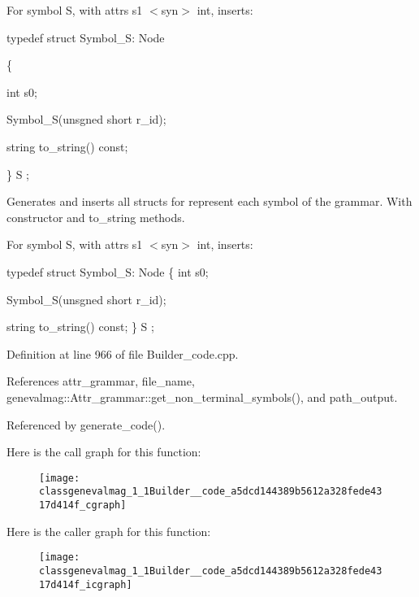 For symbol S, with attrs s1 $<$syn$>$ int, inserts:\par
 \par
 typedef struct Symbol\_\-S: Node\par
 \{\par
 int s0;\par
 \par
 Symbol\_\-S(unsgned short r\_\-id);\par
 \par
 string to\_\-string() const;\par
 \} S ;\par


Generates and inserts all structs for represent each symbol of the grammar. With constructor and to\_\-string methods.

For symbol S, with attrs s1 $<$syn$>$ int, inserts:

typedef struct Symbol\_\-S: Node \{ int s0;

Symbol\_\-S(unsgned short r\_\-id);

string to\_\-string() const; \} S ; 

Definition at line 966 of file Builder\_\-code.cpp.



References attr\_\-grammar, file\_\-name, genevalmag::Attr\_\-grammar::get\_\-non\_\-terminal\_\-symbols(), and path\_\-output.



Referenced by generate\_\-code().



Here is the call graph for this function:\nopagebreak
\begin{figure}[H]
\begin{center}
\leavevmode
\texttt{[image: classgenevalmag\_1\_1Builder\_\_code\_a5dcd144389b5612a328fede4317d414f\_cgraph]}
\end{center}
\end{figure}




Here is the caller graph for this function:\nopagebreak
\begin{figure}[H]
\begin{center}
\leavevmode
\texttt{[image: classgenevalmag\_1\_1Builder\_\_code\_a5dcd144389b5612a328fede4317d414f\_icgraph]}
\end{center}
\end{figure}


